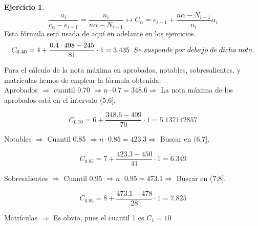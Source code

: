 \documentclass[a4paper, 12pt]{article}
\theoremstyle{definition}
\newtheorem{ej}{Ejercicio}
\begin{document}
\begin{ej}
  $$\frac{a_{i}}{c_{\alpha}-e_{i-1}} = \frac{n_{i}}{n\alpha - N_{i-1}} \longleftrightarrow C_{\alpha} = e_{i-1} + \frac{n\alpha - N_{i-1}}{n_{i}}\alpha_{i}$$
Esta fórmula será usada de aquí en adelante en los ejercicios.
\[
C_{0.40} = 4 + \frac{0.4 \cdot 498 -245}{81}\cdot 1 = 3.435 \hspace{0.2cm} Se \hspace{0.1cm} suspende \hspace{0.1cm} por \hspace{0.1cm} debajo \hspace{0.1cm} de \hspace{0.1cm} dicha \hspace{0.1cm} nota.
\]

Para el cálculo de la nota máxima en aprobados, notables, sobresalientes, y matrículas hemos de emplear la fórmula obtenida: \\

Aprobados \(\Rightarrow\) cuantil 0.70 \(\Rightarrow n \cdot 0.7= 348.6 \Rightarrow\) La nota máxima de los aprobados está en el intervalo (5,6].

\[
C_{0.70} = 6 + \frac{348.6 - 409}{70} \cdot 1 = 5.137142857
\]

Notables \(\Rightarrow\) Cuantil 0.85 \(\Rightarrow n \cdot 0.85 = 423.3 \Rightarrow\) Buscar en (6,7].

\[
C_{0.85} = 7 + \frac{423.3 - 450}{41} \cdot 1 = 6.349
\]

Sobresalientes \(\Rightarrow\) Cuantil 0.95 \(\Rightarrow n \cdot 0.95 = 473.1 \Rightarrow\) Buscar en (7,8].

\[
C_{0.95} = 8 + \frac{473.1 - 478}{28} \cdot 1 = 7.825
\]

Matrículas \(\Rightarrow\) Es obvio, pues el cuantil 1 es \(C_{1} = 10\)
\end{ej}
\end{document}
